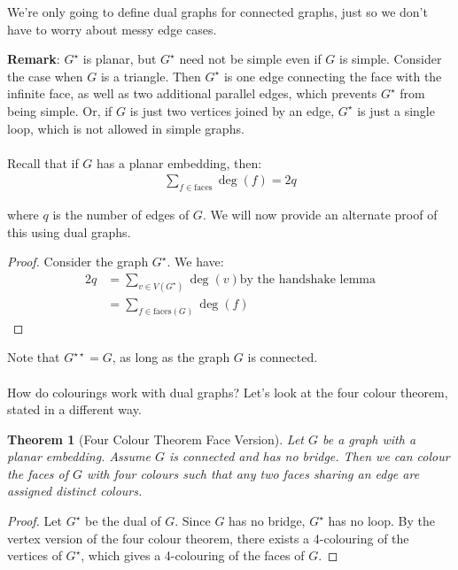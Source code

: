 \documentclass[]{article}
\newtheorem*{theorem}{Theorem}
\theoremstyle{definition}
\begin{document}
			We're only going to define dual graphs for connected graphs, just so we don't have to worry about messy edge cases.

			\textbf{Remark}: $G^\star$ is planar, but $G^\star$ need not be simple even if $G$ is simple. Consider the case when $G$ is a triangle. Then $G^\star$ is one edge connecting the face with the infinite face, as well as two additional parallel edges, which prevents $G^\star$ from being simple. Or, if $G$ is just two vertices joined by an edge, $G^\star$ is just a single loop, which is not allowed in simple graphs.
			\\ \\
			Recall that if $G$ has a planar embedding, then:
			\begin{align*}
				\sum_{f \in \text{faces}} \deg(f) = 2q
			\end{align*}

			where $q$ is the number of edges of $G$. We will now provide an alternate proof of this using dual graphs.

			\begin{proof}
				Consider the graph $G^\star$. We have:
				\begin{align*}
					2q &= \sum_{v \in V(G^\star)} \deg(v) \text{by the handshake lemma} \\
					&= \sum_{f \in \text{faces}(G)} \deg(f)
				\end{align*}
			\end{proof}

			Note that $G^{\star \star} = G$, as long as the graph $G$ is connected.
			\\ \\
			How do colourings work with dual graphs? Let's look at the four colour theorem, stated in a different way.
			\begin{theorem}[Four Colour Theorem \textendash{} Face Version]
				Let $G$ be a graph with a planar embedding. Assume $G$ is connected and has no bridge. Then we can colour the faces of $G$ with four colours such that any two faces sharing an edge are assigned distinct colours.
			\end{theorem}

			\begin{proof}
				Let $G^\star$ be the dual of $G$. Since $G$ has no bridge, $G^\star$ has no loop. By the vertex version of the four colour theorem, there exists a 4-colouring of the vertices of $G^\star$, which gives a 4-colouring of the faces of $G$.
			\end{proof}
\end{document}
